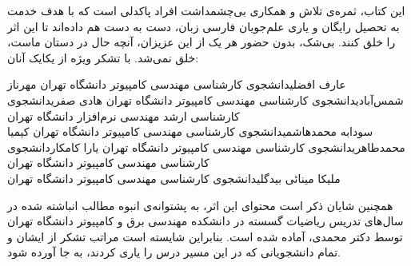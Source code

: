 \newpage
\thispagestyle{empty}

\scriptsize{
\p
این کتاب، ثمره‌ی تلاش و همکاری بی‌چشمداشت افراد پاکدلی است
که با هدف خدمت به تحصیل رایگان و یاری علم‌جویان فارسی زبان،
دست به دست هم داده‌اند تا این اثر را خلق کنند.
بی‌شک، بدون حضور هر یک از این عزیزان، آنچه حال در دستان ماست،
خلق نمی‌شد. با تشکر ویژه از یکایک آنان:
}

\scriptsize{
    \begin{AFFILIATIONS}
        \AFFILIATIONROW
        {عارف افضلی}{دانشجوی کارشناسی مهندسی کامپیوتر دانشگاه تهران}{}
        {مهرناز شمس‌آبادی}{دانشجوی کارشناسی مهندسی کامپیوتر دانشگاه تهران}{}
        {هادی صفری}{دانشجوی کارشناسی ارشد مهندسی نرم‌افزار دانشگاه تهران}{}
        \\\AFFILIATIONROW
        {سودابه محمدهاشمی}{دانشجوی کارشناسی مهندسی کامپیوتر دانشگاه تهران}{}
        {کیمیا محمدطاهری}{دانشجوی کارشناسی مهندسی کامپیوتر دانشگاه تهران}{}
        {یارا کامکار}{دانشجوی کارشناسی مهندسی کامپیوتر دانشگاه تهران}{}
        \\\AFFILIATIONROW
        {ملیکا مینائی بیدگلی}{دانشجوی کارشناسی مهندسی کامپیوتر دانشگاه تهران}{}
        {}{}{}
        {}{}{}
        \\\AFFILIATIONROW
        {}{}{}
        {}{}{}
        {}{}{}
    \end{AFFILIATIONS}
}

\scriptsize{
\p
همچنین شایان ذکر است محتوای این اثر،
به پشتوانه‌ی انبوه مطالب انباشته شده در سال‌های تدریس ریاضیات گسسته
در دانشکده مهندسی برق و کامپیوتر دانشگاه تهران
توسط دکتر محمدی، آماده شده است.
بنابراین شایسته است مراتب تشکر از ایشان و تمام دانشجویانی که در این مسیر
درس را یاری کردند، به جا آورده شود.
}